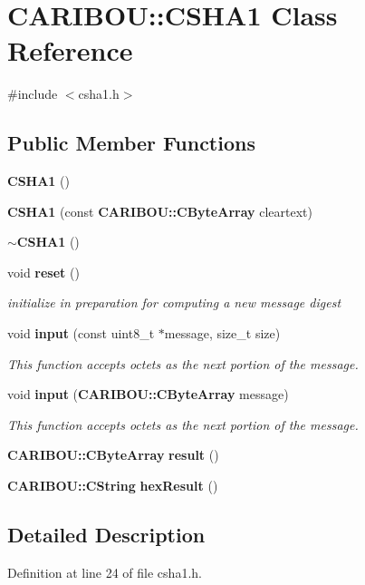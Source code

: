 \section{C\-A\-R\-I\-B\-O\-U\-:\-:C\-S\-H\-A1 Class Reference}
\label{class_c_a_r_i_b_o_u_1_1_c_s_h_a1}


{\ttfamily \#include $<$csha1.\-h$>$}

\subsection*{Public Member Functions}
\begin{DoxyCompactItemize}
\item 
{\bf C\-S\-H\-A1} ()
\item 
{\bf C\-S\-H\-A1} (const {\bf C\-A\-R\-I\-B\-O\-U\-::\-C\-Byte\-Array} cleartext)
\item 
{\bf $\sim$\-C\-S\-H\-A1} ()
\item 
void {\bf reset} ()
\begin{DoxyCompactList}\small\item\em initialize in preparation for computing a new message digest \end{DoxyCompactList}\item 
void {\bf input} (const uint8\-\_\-t $\ast$message, size\-\_\-t size)
\begin{DoxyCompactList}\small\item\em This function accepts octets as the next portion of the message. \end{DoxyCompactList}\item 
void {\bf input} ({\bf C\-A\-R\-I\-B\-O\-U\-::\-C\-Byte\-Array} message)
\begin{DoxyCompactList}\small\item\em This function accepts octets as the next portion of the message. \end{DoxyCompactList}\item 
{\bf C\-A\-R\-I\-B\-O\-U\-::\-C\-Byte\-Array} {\bf result} ()
\item 
{\bf C\-A\-R\-I\-B\-O\-U\-::\-C\-String} {\bf hex\-Result} ()
\end{DoxyCompactItemize}


\subsection{Detailed Description}


Definition at line 24 of file csha1.\-h.



